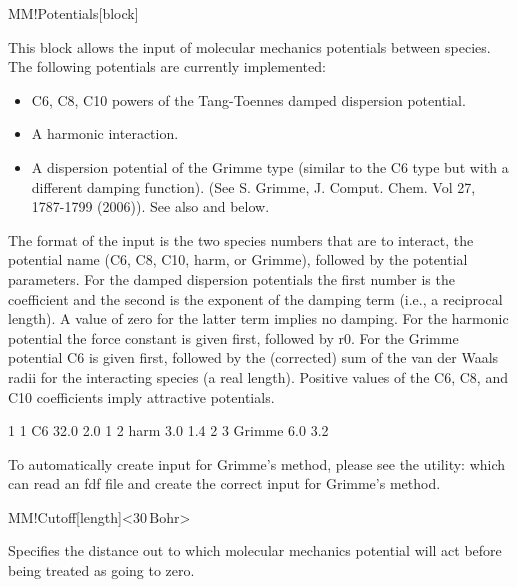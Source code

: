 \begin{fdfentry}{MM!Potentials}[block]

  This block allows the input
  of molecular mechanics potentials between species. The following
  potentials are currently implemented:
  \begin{itemize}
    \item%
    C6, C8, C10 powers of the Tang-Toennes damped dispersion
    potential.

    \item%
    A harmonic interaction.

    \item%
    A dispersion potential of the Grimme type (similar to the C6
    type but with a different damping function). (See S. Grimme,
    J. Comput. Chem. Vol 27, 1787-1799 (2006)). See also
     and  below. 

  \end{itemize}

  The format of the input is the two species numbers that are to
  interact, the potential name (C6, C8, C10, harm, or Grimme), followed
  by the potential parameters. For the damped dispersion potentials the
  first number is the coefficient and the second is the exponent of the
  damping term (i.e., a reciprocal length). A value of zero for the
  latter term implies no damping. For the harmonic potential the force
  constant is given first, followed by r0. For the Grimme potential C6
  is given first, followed by the (corrected) sum of the van der Waals
  radii for the interacting species (a real length). Positive values of
  the C6, C8, and C10 coefficients imply attractive potentials.

  \begin{fdfexample}
      1 1 C6 32.0 2.0
      1 2 harm 3.0 1.4
      2 3 Grimme 6.0 3.2
  \end{fdfexample}

  To automatically create input for Grimme's method, please see the
  utility:  which can read an fdf file and create
  the correct input for Grimme's method.

\end{fdfentry}

\begin{fdfentry}{MM!Cutoff}[length]<$30\,\mathrm{Bohr}$>

  Specifies the distance out to which molecular mechanics
  potential will act before being treated as going to zero.
  
\end{fdfentry}

